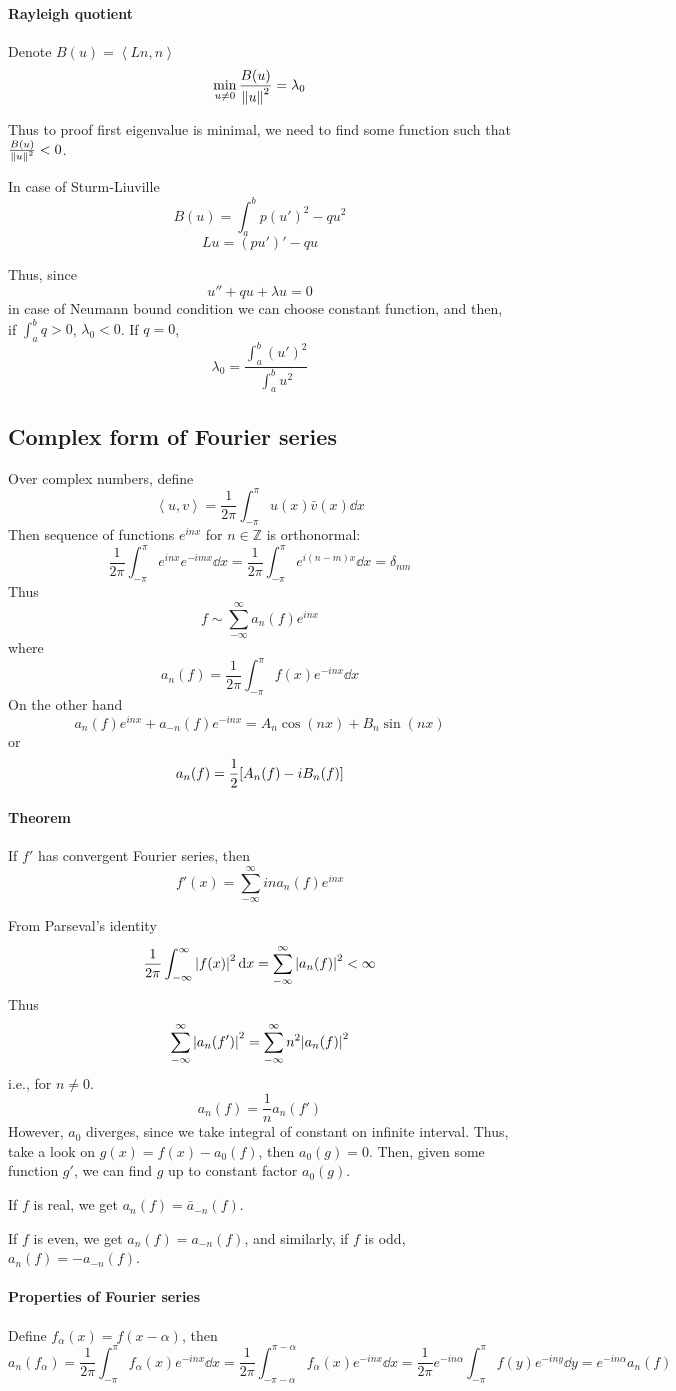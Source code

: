 \paragraph{Rayleigh quotient} %
Denote $B(u) = \left\langle Ln,n\right\rangle$
$$\min_{u\neq 0} \frac{B(u)}{\norm{u}^2} = \lambda_0$$

Thus to proof first eigenvalue is minimal, we need to find some function such that $\frac{B(u)}{\norm{u}^2} <0$.

In case of Sturm-Liuville 
$$B(u) = \int_a^b p(u')^2 - qu^2$$
$$Lu = (pu')' - qu$$

Thus, since
$$u'' + qu + \lambda u = 0$$
in case of Neumann bound condition we can choose constant function, and then, if $\int_a^b q >0$, $\lambda_0 < 0 $.
If $q=0$,
$$\lambda_0 = \frac{\int_a^b (u')^2}{\int_a^b u^2}$$
\subsection{Complex form of Fourier series}
Over complex numbers, define
$$\left\langle u,v \right\rangle = \frac{1}{2\pi} \int_{-\pi}^{\pi} u(x) \bar{v}(x) \dd{x} $$
Then sequence of functions $e^{inx}$ for $n\in \mathbb{Z}$ is orthonormal:
$$\frac{1}{2\pi} \int_{-\pi}^{\pi} e^{inx} e^{-imx} \dd{x} = \frac{1}{2\pi} \int_{-\pi}^\pi e^{i(n-m)x} \dd{x} = \delta_{nm}$$
Thus
$$f \sim \sum_{-\infty}^{\infty} a_n(f) e^{inx} $$
where
$$a_n(f) = \frac{1}{2\pi} \int_{-\pi}^\pi f(x) e^{-inx} \dd{x}$$
On the other hand
$$a_n(f)e^{inx} +a_{-n}(f)e^{-inx}  = A_n \cos(nx) + B_n\sin(nx)$$
or
$$ a_n(f) =   \frac{1}{2} \qty[A_n(f) - i B_n(f)]$$
\paragraph{Theorem}
If $f'$ has convergent Fourier series, then
$$f'(x) = \sum_{-\infty}^\infty ina_n(f) e^{inx}$$

From Parseval's identity
$$\frac{1}{2\pi } \int_{-\infty}^\infty \abs{f(x)}^2 \dd{x} = \sum_{-\infty}^\infty \abs{a_n(f)}^2 < \infty $$
Thus
$$ \sum_{-\infty}^\infty \abs{a_n(f')}^2 = \sum_{-\infty}^\infty n^2\abs{a_n(f)}^2 $$
i.e., for $n\neq 0$.
$$a_n(f) = \frac{1}{n}a_n(f')$$
However, $a_0$ diverges, since we take integral of constant on infinite interval. Thus, take a look on $g(x) = f(x) -a_0(f)$, then $a_0(g) = 0$. Then, given some function $g'$, we can find $g$ up to constant factor $a_0(g)$.

If $f$ is real, we get $a_n(f) = \bar{a}_{-n}(f)$.

If $f$ is even, we get $a_n(f) = a_{-n}(f)$, and similarly, if $f$ is odd, $a_n(f) = -a_{-n}(f)$.

\paragraph{Properties of Fourier series}
Define $f_\alpha(x) = f(x-\alpha)$, then
$$a_n(f_\alpha) = \frac{1}{2\pi} \int_{-\pi}^\pi f_\alpha(x) e^{-inx} \dd{x}= \frac{1}{2\pi} \int_{-\pi-\alpha}^{\pi-\alpha} f_\alpha(x) e^{-inx} \dd{x} = \frac{1}{2\pi}  e^{-in\alpha}\int_{-\pi}^{\pi}f(y) e^{-iny} \dd{y} =  e^{-in\alpha}a_n(f) $$